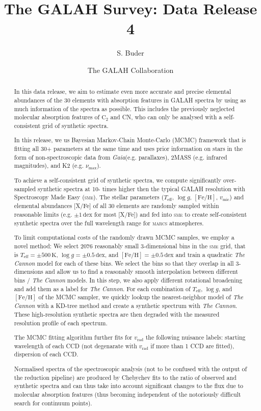 \documentclass[
  journal=pasa,
  manuscript=research-paper, %
  year=2021,
  volume=37,
]{cup-journal}
\title{The GALAH Survey: Data Release 4}
\author{S. Buder}
\affiliation{Research School of Astronomy \& Astrophysics, Australian National University, Canberra, ACT 2611, Australia}
\affiliation{ARC Centre of Excellence for All Sky Astrophysics in 3 Dimensions (ASTRO 3D), Australia}
\author{The GALAH Collaboration}
\newcommand{\Teff}{$T_\mathrm{eff}$\xspace}
\newcommand{\logg}{$\log g$\xspace}
\newcommand{\feh}{$\mathrm{[Fe/H]}$\xspace}
\newcommand{\numax}{$\nu_\mathrm{max}$\xspace}
\newcommand{\vmic}{$v_\mathrm{mic}$\xspace}
\newcommand{\vrad}{$v_\mathrm{rad}$\xspace}
\newcommand{\TheCannon}{\textit{The Cannon}\xspace}
\newcommand{\sme}{\textsc{sme}\xspace}
\newcommand{\marcs}{\textsc{marcs}\xspace}
\newcommand{\Gaia}{\textit{Gaia}\xspace}
\newcommand{\dex}{\,\mathrm{dex}}	%
\newcommand{\K}{\,\mathrm{K}}	%
\begin{document}
\begin{abstract}
In this data release, we aim to estimate even more accurate and precise elemental abundances of the 30 elements with absorption features in GALAH spectra by using as much information of the spectra as possible. This includes the previously neglected molecular absorption features of $\mathrm{C_2}$ and CN, who can only be analysed with a self-consistent grid of synthetic spectra.

In this release, we us Bayesian Markov-Chain Monte-Carlo (MCMC) framework that is fitting all 30+ parameters at the same time and uses prior information on stars in the form of non-spectroscopic data from \Gaia (e.g. parallaxes), 2MASS (e.g. infrared magnitudes), and K2 (e.g. \numax).

To achieve a self-consistent grid of synthetic spectra, we compute significantly over-sampled synthetic spectra at 10- times higher then the typical GALAH resolution with Spectroscopy Made Easy (\sme). The stellar parameters (\Teff, \logg, \feh, \vmic) and elemental abundances [X/Fe] of all 30 elements are randomly sampled within reasonable limits (e.g. $\pm 1 \dex$ for most [X/Fe]) and fed into \sme to create self-consistent synthetic spectra over the full wavelength range for \marcs atmospheres.

To limit computational costs of the randomly drawn MCMC samples, we employ a novel method: We select 2076 reasonably small 3-dimensional bins in the \sme grid, that is \Teff$= \pm 500\K$, \logg$ = \pm 0.5\dex$, and \feh$ = \pm 0.5\dex$ and train a quadratic \TheCannon model for each of these bins. We select the bins so that they overlap in all 3-dimensions and allow us to find a reasonably smooth interpolation between different bins / \TheCannon models. In this step, we also apply different rotational broadening and add them as a label for \TheCannon. For each combination of \Teff, \logg, and \feh of the MCMC sampler, we quickly lookup the nearest-neigbhor model of \TheCannon with a KD-tree method and create a synthetic spectrum with \TheCannon. These high-resolution synthetic spectra are then degraded with the measured resolution profile of each spectrum.

The MCMC fitting algorithm further fits for \vrad the following nuisance labels: starting wavelength of each CCD (not degenarate with \vrad if more than 1 CCD are fitted), dispersion of each CCD.

Normalised spectra of the spectroscopic analysis (not to be confused with the output of the reduction pipeline) are produced by Chebychev fits to the ratio of observed and synthetic spectra and can thus take into account significant changes to the flux due to molecular absorption features (thus becoming independent of the notoriously difficult search for continuum points).


\end{abstract}
\end{document}

